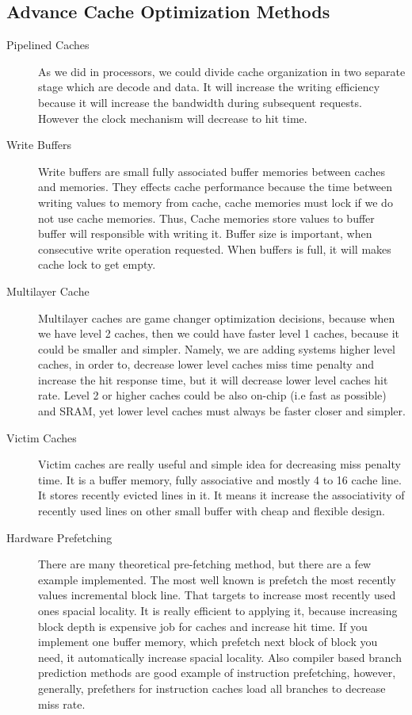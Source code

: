     \subsection*{Advance Cache Optimization Methods}
    \begin{description}
        \item[Pipelined Caches] As we did in processors, we could divide cache organization in two separate stage which are decode and data. It will increase the writing efficiency because it will increase the bandwidth during subsequent requests. However the clock mechanism will decrease to hit time.  
        \item[Write Buffers] Write buffers are small fully associated buffer memories between caches and memories. They effects cache performance because the time between writing values to memory from cache, cache memories must lock if we do not use cache memories. Thus, Cache memories store values to buffer buffer will responsible with writing it. Buffer size is important, when consecutive write operation requested. When buffers is full, it will makes cache lock to get empty.
        \item[Multilayer Cache] Multilayer caches are game changer optimization decisions, because when we have level 2 caches, then we could have faster level 1 caches, because it could be smaller and simpler. Namely, we are adding systems higher level caches, in order to, decrease lower level caches miss time penalty and increase the hit response time, but it will decrease lower level caches hit rate. Level 2 or higher caches could be also on-chip (i.e fast as possible) and SRAM, yet lower level caches must always be faster closer and simpler.
        \item[Victim Caches] Victim caches are really useful and simple idea for decreasing miss penalty time. It is a buffer memory, fully associative and mostly 4 to 16 cache line. It stores recently evicted lines in it. It means it increase the associativity of recently used lines on other small buffer with cheap and flexible design.
        \item[Hardware Prefetching] There are many theoretical pre-fetching method, but there are a few example implemented. The most well known is prefetch the most recently values incremental block line. That targets to increase most recently used ones spacial locality. It is really efficient to applying it, because increasing block depth is expensive job for caches and increase hit time. If you implement one buffer memory, which prefetch next block of block you need, it automatically increase spacial locality. Also compiler based branch prediction methods are good example of instruction prefetching, however, generally, prefethers for instruction caches load all branches to decrease miss rate.
    \end{description}
